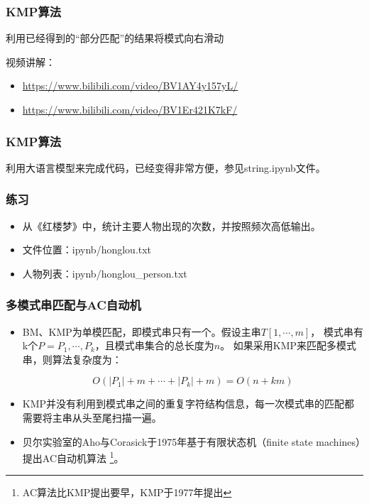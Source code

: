 \begin{frame}[fragile]
  \frametitle{KMP算法}
  利用已经得到的“部分匹配”的结果将模式向右滑动

  视频讲解：
  \begin{itemize}
    \item \url{https://www.bilibili.com/video/BV1AY4y157yL/}
    \item \url{https://www.bilibili.com/video/BV1Er421K7kF/}
  \end{itemize}
\end{frame}

\begin{frame}[fragile]
  \frametitle{KMP算法}
  利用大语言模型来完成代码，已经变得非常方便，参见string.ipynb文件。

\end{frame}

\begin{frame}[fragile]
  \frametitle{练习}
  \begin{itemize}
  \item 从《红楼梦》中，统计主要人物出现的次数，并按照频次高低输出。

  \item 文件位置：ipynb/honglou.txt

  \item 人物列表：ipynb/honglou\_person.txt
  \end{itemize}
\end{frame}


\begin{frame}[fragile]
  \frametitle{多模式串匹配与AC自动机}
    \begin{itemize}
    \item BM、KMP为单模匹配，即模式串只有一个。假设主串$T[1, \cdots, m]$，
    模式串有k个$P={P_1,\cdots,P_k}$，且模式串集合的总长度为$n$。
    如果采用KMP来匹配多模式串，则算法复杂度为：

    \[O(|P_1|+m+\cdots+|P_k|+m)=O(n+km)\]
  
    \item KMP并没有利用到模式串之间的重复字符结构信息，每一次模式串的匹配都需要将主串从头至尾扫描一遍。

    \item 贝尔实验室的Aho与Corasick于1975年基于有限状态机（finite state machines）提出AC自动机算法
  \footnote{AC算法比KMP提出要早，KMP于1977年提出}。
  \end{itemize}
\end{frame}

